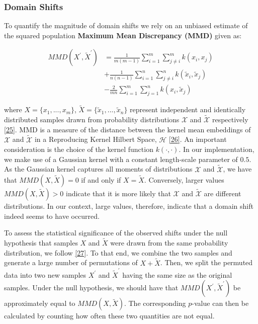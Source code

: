 \documentclass[conference,final,]{IEEEtran}
\theoremstyle{definition}
\theoremstyle{definition}
\theoremstyle{definition}
\theoremstyle{definition}
\theoremstyle{remark}
\begin{document}
\hypertarget{domain-shifts}{%
\subsubsection{Domain Shifts}\label{domain-shifts}}

To quantify the magnitude of domain shifts we rely on an unbiased estimate of the squared population \textbf{Maximum Mean Discrepancy (MMD)} given as:

\begin{equation}
\begin{aligned}
MMD({X}^\prime,\tilde{X}^\prime) &= \frac{1}{m(m-1)}\sum_{i=1}^m\sum_{j\neq i}^m k(x_i,x_j) \\ &+ \frac{1}{n(n-1)}\sum_{i=1}^n\sum_{j\neq i}^n k(\tilde{x}_i,\tilde{x}_j) \\ &- \frac{2}{mn}\sum_{i=1}^m\sum_{j=1}^n k(x_i,\tilde{x}_j) \label{eq:mmd}
\end{aligned}
\end{equation}

where \(X=\{x_1,...,x_m\}\), \(\tilde{X}=\{\tilde{x}_1,...,\tilde{x}_n\}\) represent independent and identically distributed samples drawn from probability distributions \(\mathcal{X}\) and \(\mathcal{\tilde{X}}\) respectively \protect\hyperlink{ref-gretton2012kernel}{{[}25{]}}. MMD is a measure of the distance between the kernel mean embeddings of \(\mathcal{X}\) and \(\mathcal{\tilde{X}}\) in a Reproducing Kernel Hilbert Space, \(\mathcal{H}\) \protect\hyperlink{ref-berlinet2011reproducing}{{[}26{]}}. An important consideration is the choice of the kernel function \(k(\cdot,\cdot)\). In our implementation, we make use of a Gaussian kernel with a constant length-scale parameter of \(0.5\). As the Gaussian kernel captures all moments of distributions \(\mathcal{X}\) and \(\mathcal{\tilde{X}}\), we have that \(MMD(X,\tilde{X})=0\) if and only if \(X=\tilde{X}\). Conversely, larger values \(MMD(X,\tilde{X})>0\) indicate that it is more likely that \(\mathcal{X}\) and \(\mathcal{\tilde{X}}\) are different distributions. In our context, large values, therefore, indicate that a domain shift indeed seems to have occurred.

To assess the statistical significance of the observed shifts under the null hypothesis that samples \(X\) and \(\tilde{X}\) were drawn from the same probability distribution, we follow \protect\hyperlink{ref-arcones1992bootstrap}{{[}27{]}}. To that end, we combine the two samples and generate a large number of permutations of \(X + \tilde{X}\). Then, we split the permuted data into two new samples \(X^\prime\) and \(\tilde{X}^\prime\) having the same size as the original samples. Under the null hypothesis, we should have that \(MMD(X^\prime,\tilde{X}^\prime)\) be approximately equal to \(MMD(X,\tilde{X})\). The corresponding \(p\)-value can then be calculated by counting how often these two quantities are not equal.
\end{document}
